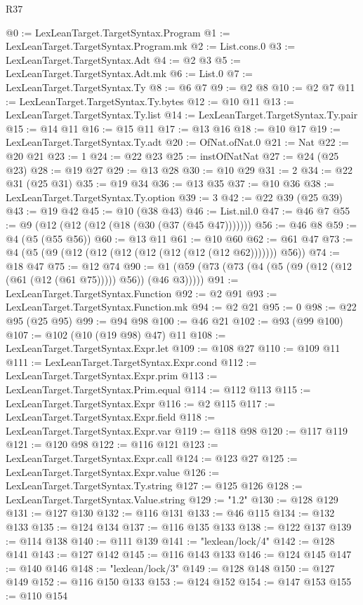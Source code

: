 \begin{lexlean}{R37}
\begin{coremodule}
@0 := LexLeanTarget.TargetSyntax.Program
@1 := LexLeanTarget.TargetSyntax.Program.mk
@2 := List.cons.{0}
@3 := LexLeanTarget.TargetSyntax.Adt
@4 := @2 @3
@5 := LexLeanTarget.TargetSyntax.Adt.mk
@6 := List.{0}
@7 := LexLeanTarget.TargetSyntax.Ty
@8 := @6 @7
@9 := @2 @8
@10 := @2 @7
@11 := LexLeanTarget.TargetSyntax.Ty.bytes
@12 := @10 @11
@13 := LexLeanTarget.TargetSyntax.Ty.list
@14 := LexLeanTarget.TargetSyntax.Ty.pair
@15 := @14 @11
@16 := @15 @11
@17 := @13 @16
@18 := @10 @17
@19 := LexLeanTarget.TargetSyntax.Ty.adt
@20 := OfNat.ofNat.{0}
@21 := Nat
@22 := @20 @21
@23 := 1
@24 := @22 @23
@25 := instOfNatNat
@27 := @24 (@25 @23)
@28 := @19 @27
@29 := @13 @28
@30 := @10 @29
@31 := 2
@34 := @22 @31 (@25 @31)
@35 := @19 @34
@36 := @13 @35
@37 := @10 @36
@38 := LexLeanTarget.TargetSyntax.Ty.option
@39 := 3
@42 := @22 @39 (@25 @39)
@43 := @19 @42
@45 := @10 (@38 @43)
@46 := List.nil.{0}
@47 := @46 @7
@55 := @9 (@12 (@12 (@12 (@18 (@30 (@37 (@45 @47)))))))
@56 := @46 @8
@59 := @4 (@5 (@55 @56))
@60 := @13 @11
@61 := @10 @60
@62 := @61 @47
@73 := @4 (@5 (@9 (@12 (@12 (@12 (@12 (@12 (@12 (@12 @62))))))) @56))
@74 := @18 @47
@75 := @12 @74
@90 := @1 (@59 (@73 (@73 (@4 (@5 (@9 (@12 (@12 (@61 (@12 (@61 @75))))) @56)) (@46 @3)))))
@91 := LexLeanTarget.TargetSyntax.Function
@92 := @2 @91
@93 := LexLeanTarget.TargetSyntax.Function.mk
@94 := @2 @21
@95 := 0
@98 := @22 @95 (@25 @95)
@99 := @94 @98
@100 := @46 @21
@102 := @93 (@99 @100)
@107 := @102 (@10 (@19 @98) @47) @11
@108 := LexLeanTarget.TargetSyntax.Expr.let
@109 := @108 @27
@110 := @109 @11
@111 := LexLeanTarget.TargetSyntax.Expr.cond
@112 := LexLeanTarget.TargetSyntax.Expr.prim
@113 := LexLeanTarget.TargetSyntax.Prim.equal
@114 := @112 @113
@115 := LexLeanTarget.TargetSyntax.Expr
@116 := @2 @115
@117 := LexLeanTarget.TargetSyntax.Expr.field
@118 := LexLeanTarget.TargetSyntax.Expr.var
@119 := @118 @98
@120 := @117 @119
@121 := @120 @98
@122 := @116 @121
@123 := LexLeanTarget.TargetSyntax.Expr.call
@124 := @123 @27
@125 := LexLeanTarget.TargetSyntax.Expr.value
@126 := LexLeanTarget.TargetSyntax.Ty.string
@127 := @125 @126
@128 := LexLeanTarget.TargetSyntax.Value.string
@129 := "1.2"
@130 := @128 @129
@131 := @127 @130
@132 := @116 @131
@133 := @46 @115
@134 := @132 @133
@135 := @124 @134
@137 := @116 @135 @133
@138 := @122 @137
@139 := @114 @138
@140 := @111 @139
@141 := "lexlean/lock/4"
@142 := @128 @141
@143 := @127 @142
@145 := @116 @143 @133
@146 := @124 @145
@147 := @140 @146
@148 := "lexlean/lock/3"
@149 := @128 @148
@150 := @127 @149
@152 := @116 @150 @133
@153 := @124 @152
@154 := @147 @153
@155 := @110 @154

\end{coremodule}
\end{lexlean}

